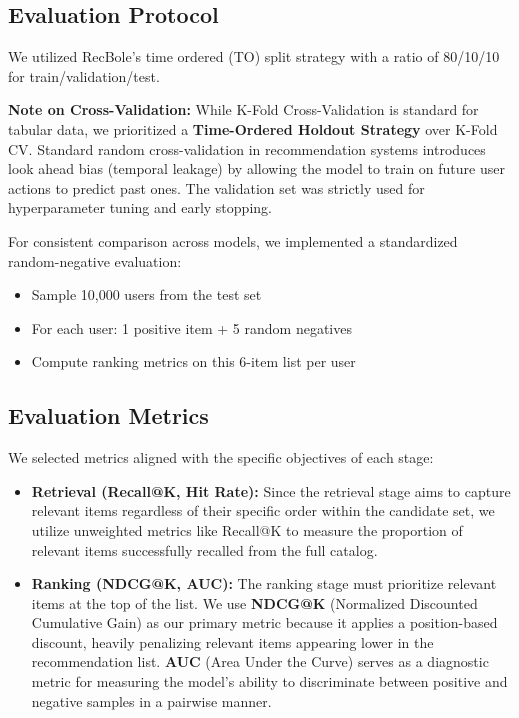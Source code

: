 \documentclass[twocolumn, 10pt, a4paper]{article}
\begin{document}
\subsection{Evaluation Protocol}
We utilized RecBole's time ordered (TO) split strategy with a ratio of 80/10/10 for train/validation/test.

\textbf{Note on Cross-Validation:} While K-Fold Cross-Validation is standard for tabular data, we prioritized a \textbf{Time-Ordered Holdout Strategy} over K-Fold CV. Standard random cross-validation in recommendation systems introduces look ahead bias (temporal leakage) by allowing the model to train on future user actions to predict past ones. The validation set was strictly used for hyperparameter tuning and early stopping.

For consistent comparison across models, we implemented a standardized random-negative evaluation:
\begin{itemize}
    \item Sample 10,000 users from the test set
    \item For each user: 1 positive item + 5 random negatives 
    \item Compute ranking metrics on this 6-item list per user
\end{itemize}

\subsection{Evaluation Metrics}
We selected metrics aligned with the specific objectives of each stage:
\begin{itemize}
    \item \textbf{Retrieval (Recall@K, Hit Rate):} Since the retrieval stage aims to capture relevant items regardless of their specific order within the candidate set, we utilize unweighted metrics like Recall@K to measure the proportion of relevant items successfully recalled from the full catalog.
    \item \textbf{Ranking (NDCG@K, AUC):} The ranking stage must prioritize relevant items at the top of the list. We use \textbf{NDCG@K} (Normalized Discounted Cumulative Gain) as our primary metric because it applies a position-based discount, heavily penalizing relevant items appearing lower in the recommendation list. \textbf{AUC} (Area Under the Curve) serves as a diagnostic metric for measuring the model's ability to discriminate between positive and negative samples in a pairwise manner.
\end{itemize}
\end{document}
